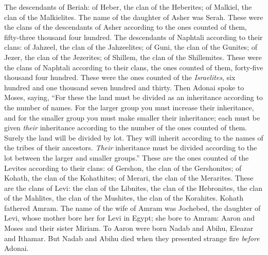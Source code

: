 \begin{biblechapter}
\verse The descendants of Beriah: of Heber, the clan of the Heberites; of Malkiel, the clan of the Malkielites.
\verse The name of the daughter of Asher was Serah.
\verse These were the clans of the descendants of Asher according to the ones counted of them, fifty-three thousand four hundred.
\verse The descendants of Naphtali according to their clans: of Jahzeel, the clan of the Jahzeelites; of Guni, the clan of the Gunites;
\verse of Jezer, the clan of the Jezerites; of Shillem, the clan of the Shillemites.
\verse These were the clans of Naphtali according to their clans, the ones counted of them, forty-five thousand four hundred.
\verse These were the ones counted of the \textit{Israelites}, six hundred and one thousand seven hundred and thirty.
\verse Then Adonai spoke to Moses, saying,
\verse “For these the land must be divided as an inheritance according to the number of names.
\verse For the larger group you must increase their inheritance, and for the smaller group you must make smaller their inheritance; each must be given \textit{their} inheritance according to the number of the ones counted of them.
\verse Surely the land will be divided by lot. They will inherit according to the names of the tribes of their ancestors.
\verse \textit{Their} inheritance must be divided according to the lot between the larger and smaller groups.”
\verse These are the ones counted of the Levites according to their clans: of Gershon, the clan of the Gershonites; of Kohath, the clan of the Kohathites; of Merari, the clan of the Merarites.
\verse These are the clans of Levi: the clan of the Libnites, the clan of the Hebronites, the clan of the Mahlites, the clan of the Mushites, the clan of the Korahites. Kohath fathered Amram.
\verse The name of the wife of Amram was Jochebed, the daughter of Levi, whose mother bore her for Levi in Egypt; she bore to Amram: Aaron and Moses and their sister Miriam.
\verse To Aaron were born Nadab and Abihu, Eleazar and Ithamar.
\verse But Nadab and Abihu died when they presented strange fire \textit{before} Adonai.

\end{biblechapter}
